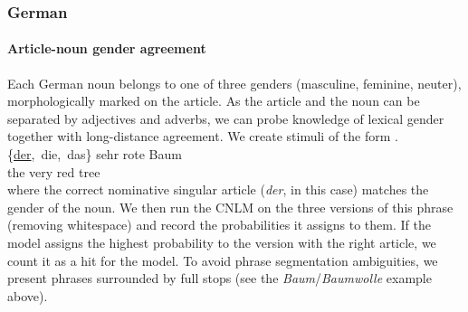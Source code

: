 \subsubsection{German}%


\paragraph{Article-noun  gender agreement}
Each German noun belongs to one of three genders (masculine, feminine, neuter), morphologically marked on the article. As the article and the noun can be separated by adjectives and adverbs, we can probe knowledge of lexical gender together with long-distance agreement.
We create stimuli of the form
\exg. \label{ex:german-gender} \{\underline{der},\ die,\ das\} sehr rote Baum \\
the very red tree \\

where the correct nominative singular article (\emph{der}, in this
case) matches the gender of the noun.  We then run the CNLM on the
three versions of this phrase (removing whitespace) and record the
probabilities it assigns to them. If the model assigns the highest
probability to the version with the right article, we count it as a
hit for the model. To avoid phrase segmentation ambiguities, we
present phrases surrounded by full stops (see the
\emph{Baum}/\emph{Baumwolle} example above).

